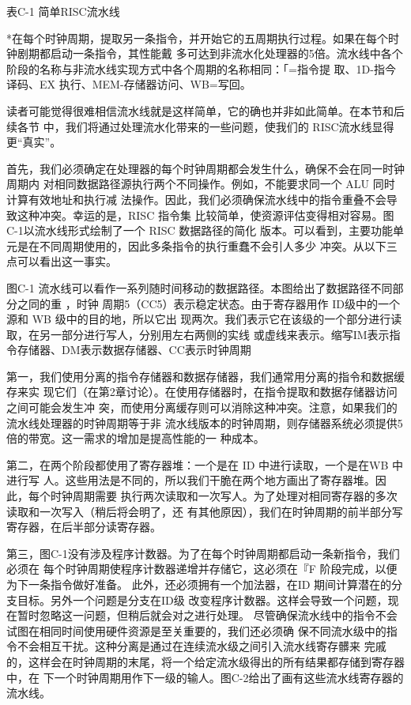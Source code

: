表C-1 简单RISC流水线

*在每个时钟周期，提取另一条指令，并开始它的五周期执行过程。如果在每个时钟剧期都启动一条指令，其性能戴
多可达到非流水化处理器的5倍。流水线中各个阶段的名称与非流水线实现方式中各个周期的名称相同：「=指令提
取、1D-指今译码、EX 执行、MEM-存储器访问、WB=写回。

读者可能觉得很难相信流水线就是这样简单，它的确也并非如此简单。在本节和后续各节
中，我们将通过处理流水化带来的一些问题，使我们的 RISC流水线显得更“真实”。

首先，我们必须确定在处理器的每个时钟周期都会发生什么，确保不会在同一时钟周期内
对相同数据路径源执行两个不同操作。例如，不能要求同一个 ALU 同时计算有效地址和执行减
法操作。因此，我们必须确保流水线中的指令重叠不会导致这种冲突。幸运的是，RISC 指令集
比较简单，使资源评估变得相对容易。图C-1以流水线形式绘制了一个 RISC 数据路径的简化
版本。可以看到，主要功能单元是在不同周期使用的，因此多条指令的执行重蠢不会引人多少
冲突。从以下三点可以看出这一事实。

图C-1 流水线可以看作一系列随时间移动的数据路径。本图给出了数据路径不同部分之同的重 ，时钟
周期5（CC5）表示稳定状态。由于寄存器用作 ID级中的一个源和 WB 级中的目的地，所以它出
现两次。我们表示它在该级的一个部分进行读取，在另一部分进行写人，分别用左右两侧的实线
或虚线来表示。缩写IM表示指令存储器、DM表示数据存储器、CC表示时钟周期

第一，我们使用分离的指令存储器和数据存储器，我们通常用分离的指令和数据缓存来实
现它们（在第2章讨论）。在使用存储器时，在指令提取和数据存储器访问之间可能会发生冲
突，而使用分离缓存则可以消除这种冲突。注意，如果我们的流水线处理器的时钟周期等于非
流水线版本的时钟周期，则存储器系统必须提供5倍的带宽。这一需求的增加是提高性能的一
种成本。

第二，在两个阶段都使用了寄存器堆：一个是在 ID 中进行读取，一个是在WB 中进行写
人。这些用法是不同的，所以我们干脆在两个地方画出了寄存器堆。因此，每个时钟周期需要
执行两次读取和一次写人。为了处理对相同寄存器的多次读取和一次写入（稍后将会明了，还
有其他原因），我们在时钟周期的前半部分写寄存器，在后半部分读寄存器。

第三，图C-1没有涉及程序计数器。为了在每个时钟周期都启动一条新指令，我们必须在
每个时钟周期使程序计数器递增并存储它，这必须在『F 阶段完成，以便为下一条指令做好准备。
此外，还必须拥有一个加法器，在ID 期间计算潜在的分支目标。另外一个问题是分支在ID级
改变程序计数器。这样会导致一个问题，现在暂时忽略这一问题，但稍后就会对之进行处理。
尽管确保流水线中的指令不会试图在相同时间使用硬件资源是至关重要的，我们还必须确
保不同流水级中的指令不会相互干扰。这种分离是通过在连续流水级之间引入流水线寄存髒来
完戚的，这样会在时钟周期的末尾，将一个给定流水级得出的所有结果都存储到寄存器中，在
下一个时钟周期用作下一级的输人。图C-2给出了画有这些流水线寄存器的流水线。

